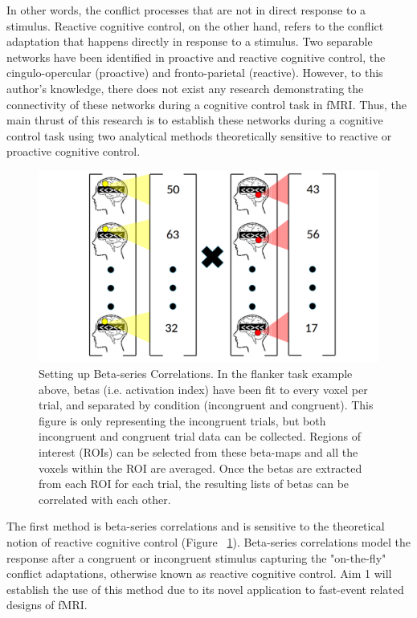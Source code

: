 \documentclass[phd,appendix,figures]{uithesis}
\begin{document}
In other words, the conflict processes that are not in direct response to a stimulus.
Reactive cognitive control, on the other hand, refers to the conflict adaptation that happens directly in response to a stimulus.
Two separable networks have been identified in proactive and reactive cognitive control, the cingulo-opercular (proactive) and fronto-parietal (reactive).
However, to this author's knowledge, there does not exist any research demonstrating the connectivity of these networks during a cognitive control task in fMRI.
Thus, the main thrust of this research is to establish these networks during a cognitive control task using two analytical methods theoretically sensitive to reactive or proactive cognitive control.

\begin{figure}[H]%
    \centering
    \includegraphics[scale=0.25]{betaseries_correlation_illustration}
    \caption{Setting up Beta-series Correlations. In the flanker task example above, betas (i.e. activation index) have been fit to every voxel per trial, and separated by condition (incongruent and congruent). This figure is only representing the incongruent trials, but both incongruent and congruent trial data can be collected. Regions of interest (ROIs) can be selected from these beta-maps and all the voxels within the ROI are averaged. Once the betas are extracted from each ROI for each trial, the resulting lists of betas can be correlated with each other.}%
    \label{fig:betaseries_correlation_illustration}%
\end{figure}

The first method is beta-series correlations and is sensitive to the theoretical notion of reactive cognitive control (Figure ~\ref{fig:betaseries_correlation_illustration}). 
Beta-series correlations model the response after a congruent or incongruent stimulus capturing the "on-the-fly" conflict adaptations, otherwise known as reactive cognitive control.
Aim 1 will establish the use of this method due to its novel application to fast-event related designs of fMRI.
\end{document}
